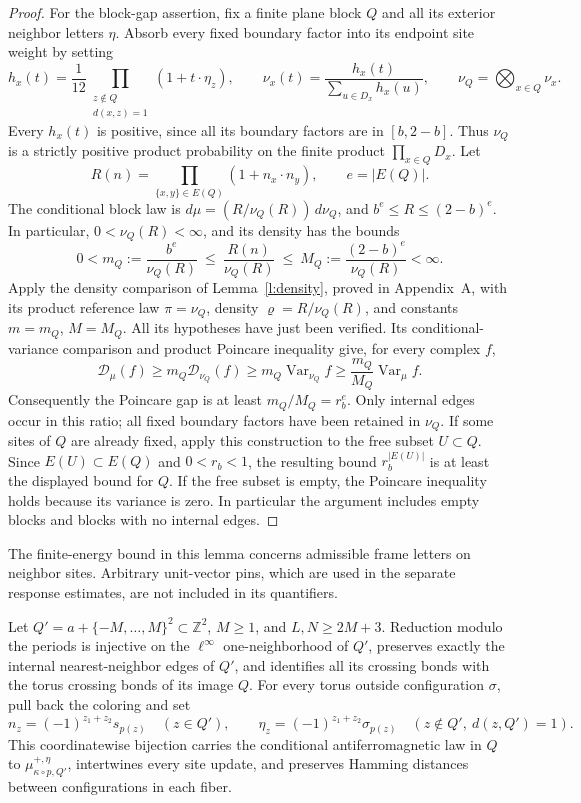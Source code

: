 \begin{proof}
For the block-gap assertion, fix a finite plane block \(Q\) and
all its exterior neighbor letters \(\eta\). Absorb every fixed
boundary factor into its endpoint site weight by setting
\[
 h_x(t)=\frac1{12}
       \prod_{\substack{z\notin Q\\d(x,z)=1}}
                    (1+t\cdot\eta_z),\qquad
 \nu_x(t)=\frac{h_x(t)}{\sum_{u\in D_x}h_x(u)},\qquad
 \nu_Q=\bigotimes_{x\in Q}\nu_x.
\]
Every \(h_x(t)\) is positive, since all its boundary factors are
in \([b,2-b]\). Thus \(\nu_Q\) is a strictly positive product
probability on the finite product \(\prod_{x\in Q}D_x\). Let
\[
 R(n)=\prod_{\{x,y\}\in E(Q)}(1+n_x\cdot n_y),\qquad
 e=|E(Q)|.
\]
The conditional block law is \(d\mu=(R/\nu_Q(R))\,d\nu_Q\),
and \(b^e\le R\le(2-b)^e\). In particular,
\(0<\nu_Q(R)<\infty\), and its density has the bounds
\[
 0<m_Q:=\frac{b^e}{\nu_Q(R)}
 \ \le\ \frac{R(n)}{\nu_Q(R)}
 \ \le\ M_Q:=\frac{(2-b)^e}{\nu_Q(R)}<\infty.
\]
Apply the density comparison of Lemma~\ref{l:density}, proved in
Appendix~A, with its product reference law \(\pi=\nu_Q\),
density \(\varrho=R/\nu_Q(R)\), and constants \(m=m_Q\),
\(M=M_Q\). All its hypotheses have just been verified. Its
conditional-variance comparison and product Poincare inequality give,
for every complex \(f\),
\[
 \mathcal D_\mu(f)
 \ge m_Q\mathcal D_{\nu_Q}(f)
 \ge m_Q\operatorname{Var}_{\nu_Q}f
 \ge\frac{m_Q}{M_Q}\operatorname{Var}_\mu f.
\]
Consequently the Poincare gap is at least
\(m_Q/M_Q=r_b^e\). Only internal edges occur in this ratio;
all fixed boundary factors have been retained in \(\nu_Q\).
If some sites of \(Q\) are already fixed, apply this construction
to the free subset \(U\subset Q\). Since
\(E(U)\subset E(Q)\) and \(0<r_b<1\), the resulting bound
\(r_b^{|E(U)|}\) is at least the displayed bound for \(Q\).
If the free subset is empty, the Poincare inequality holds because
its variance is zero. In particular the argument includes empty
blocks and blocks with no internal edges.
\end{proof}

The finite-energy bound in this lemma concerns admissible frame
letters on neighbor sites. Arbitrary unit-vector pins, which are
used in the separate response estimates, are not included in its
quantifiers.

\begin{lemma}\label{l:boxlift}
Let \(Q'=a+\{-M,\ldots,M\}^2\subset\mathbb Z^2\), \(M\ge1\),
and \(L,N\ge2M+3\). Reduction modulo the periods is injective
on the \(\ell^\infty\) one-neighborhood of \(Q'\), preserves exactly
the internal nearest-neighbor edges of \(Q'\), and identifies all its
crossing bonds with the torus crossing bonds of its image \(Q\).
For every torus outside configuration \(\sigma\), pull back the
coloring and set
\[
 n_z=(-1)^{z_1+z_2}s_{p(z)}\quad(z\in Q'),\qquad
 \eta_z=(-1)^{z_1+z_2}\sigma_{p(z)}
       \quad(z\notin Q',\ d(z,Q')=1).
\]
This coordinatewise bijection carries the conditional
antiferromagnetic law in \(Q\) to
\(\mu^{+,\eta}_{\kappa\circ p,Q'}\), intertwines every site update,
and preserves Hamming distances between configurations in each fiber.
\end{lemma}

